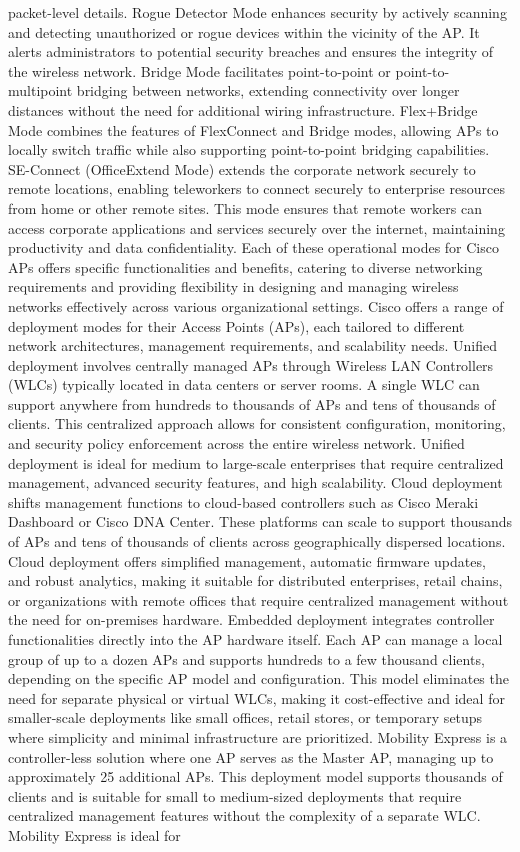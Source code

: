 \documentclass{article}
\begin{document}
packet-level details. Rogue Detector Mode enhances security by actively scanning and detecting unauthorized or rogue devices within the vicinity of the AP. It alerts administrators to potential security breaches and ensures the integrity of the wireless network. Bridge Mode facilitates point-to-point or point-to-multipoint bridging between networks, extending connectivity over longer distances without the need for additional wiring infrastructure. Flex+Bridge Mode combines the features of FlexConnect and Bridge modes, allowing APs to locally switch traffic while also supporting point-to-point bridging capabilities. SE-Connect (OfficeExtend Mode) extends the corporate network securely to remote locations, enabling teleworkers to connect securely to enterprise resources from home or other remote sites. This mode ensures that remote workers can access corporate applications and services securely over the internet, maintaining productivity and data confidentiality. Each of these operational modes for Cisco APs offers specific functionalities and benefits, catering to diverse networking requirements and providing flexibility in designing and managing wireless networks effectively across various organizational settings.  Cisco offers a range of deployment modes for their Access Points (APs), each tailored to different network architectures, management requirements, and scalability needs. Unified deployment involves centrally managed APs through Wireless LAN Controllers (WLCs) typically located in data centers or server rooms. A single WLC can support anywhere from hundreds to thousands of APs and tens of thousands of clients. This centralized approach allows for consistent configuration, monitoring, and security policy enforcement across the entire wireless network. Unified deployment is ideal for medium to large-scale enterprises that require centralized management, advanced security features, and high scalability. Cloud deployment shifts management functions to cloud-based controllers such as Cisco Meraki Dashboard or Cisco DNA Center. These platforms can scale to support thousands of APs and tens of thousands of clients across geographically dispersed locations. Cloud deployment offers simplified management, automatic firmware updates, and robust analytics, making it suitable for distributed enterprises, retail chains, or organizations with remote offices that require centralized management without the need for on-premises hardware. Embedded deployment integrates controller functionalities directly into the AP hardware itself. Each AP can manage a local group of up to a dozen APs and supports hundreds to a few thousand clients, depending on the specific AP model and configuration. This model eliminates the need for separate physical or virtual WLCs, making it cost-effective and ideal for smaller-scale deployments like small offices, retail stores, or temporary setups where simplicity and minimal infrastructure are prioritized. Mobility Express is a controller-less solution where one AP serves as the Master AP, managing up to approximately 25 additional APs. This deployment model supports thousands of clients and is suitable for small to medium-sized deployments that require centralized management features without the complexity of a separate WLC. Mobility Express is ideal for 
\end{document}
